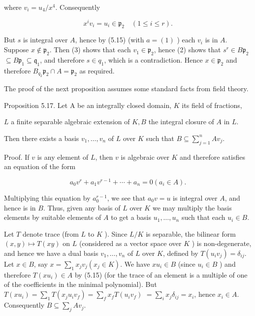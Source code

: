 \documentclass{standalone}
\theoremstyle{definition}
\theoremstyle{remark}
\begin{document}
where $v_{i}=u_{4} / x^{4}$. Consequently

\[
x^{i} v_{i}=u_{i} \in \mathfrak{p}_{2} \quad(1 \leqslant i \leqslant r) .
\]

But $s$ is integral over $A$, hence by (5.15) (with $a=(1)$ ) each $v_{i}$ is in $A$. Suppose $x \notin \mathfrak{p}_{2}$. Then (3) shows that each $v_{1} \in \mathfrak{p}_{2}$, hence (2) shows that $s^{r} \in B \mathfrak{p}_{2}$ $\subseteq B \mathfrak{p}_{1} \subseteq \mathfrak{q}_{1}$, and therefore $s \in q_{1}$, which is a contradiction. Hence $x \in \mathfrak{p}_{2}$ and therefore $B_{q_{2}} \mathfrak{p}_{2} \cap A=\mathfrak{p}_{2}$ as required.

The proof of the next proposition assumes some standard facts from field theory.

Proposition 5.17. Let A be an integrally closed domain, $K$ its field of fractions,

$L$ a finite separable algebraic extension of $K, B$ the integral closure of $A$ in $L$.

Then there exists a basis $v_{1}, \ldots, v_{n}$ of $L$ over $K$ such that $B \subseteq \sum_{j=1}^{n} A v_{j}$.

Proof. If $v$ is any element of $L$, then $v$ is algebraic over $K$ and therefore satisfies an equation of the form

\[
a_{0} v^{r}+a_{1} v^{r-1}+\cdots+a_{n}=0\left(a_{i} \in A\right) .
\]

Multiplying this equation by $a_{0}^{r-1}$, we see that $a_{0} v=u$ is integral over $A$, and hence is in $B$. Thus, given any basis of $L$ over $K$ we may multiply the basis elements by suitable elements of $A$ to get a basis $u_{1}, \ldots, u_{n}$ such that each $u_{i} \in B$.

Let $T$ denote trace (from $L$ to $K$ ). Since $L / K$ is separable, the bilinear form $(x, y) \mapsto T(x y)$ on $L$ (considered as a vector space over $K$ ) is non-degenerate, and hence we have a dual basis $v_{1}, \ldots, v_{n}$ of $L$ over $K$, defined by $T\left(u_{i} v_{j}\right)=\delta_{i j}$. Let $x \in B$, say $x=\sum_{1} x_{j} v_{j}\left(x_{j} \in K\right)$. We have $x u_{i} \in B$ (since $u_{i} \in B$ ) and therefore $T\left(x u_{i}\right) \in A$ by (5.15) (for the trace of an element is a multiple of one of the coefficients in the minimal polynomial). But $T\left(x u_{i}\right)=\sum_{1} T\left(x_{j} u_{i} v_{f}\right)=\sum_{f} x_{f} T\left(u_{i} v_{f}\right)$ $=\sum_{i} x_{j} \delta_{i j}=x_{i}$, hence $x_{i} \in A$. Consequently $B \subseteq \sum_{j} A v_{j}$.
\end{document}
